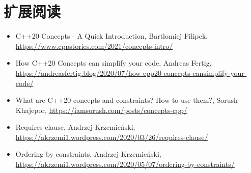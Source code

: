 \section{扩展阅读}
\begin{itemize}
\item
C++20 Concepts - A Quick Introduction, Bartlomiej Filipek, \url{https://www.cppstories.com/2021/concepts-intro/}

\item
How C++20 Concepts can simplify your code, Andreas Fertig, \url{https://andreasfertig.blog/2020/07/how-cpp20-concepts-cansimplify-your-code/}

\item
What are C++20 concepts and constraints? How to use them?, Sorush Khajepor, \url{https://iamsorush.com/posts/concepts-cpp/}

\item
Requires-clause, Andrzej Krzemieński, \url{https://akrzemi1.wordpress.com/2020/03/26/requires-clause/}

\item
Ordering by constraints, Andrzej Krzemieński, \url{https://akrzemi1.wordpress.com/2020/05/07/ordering-by-constraints/}
\end{itemize}